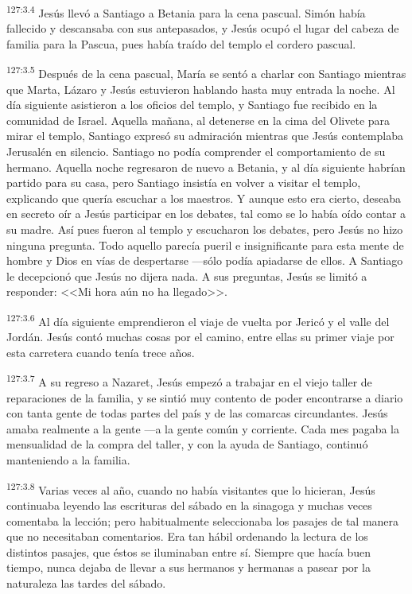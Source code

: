 \par 
\textsuperscript{127:3.4} Jesús llevó a Santiago a Betania para la cena pascual. Simón había fallecido y descansaba con sus antepasados, y Jesús ocupó el lugar del cabeza de familia para la Pascua, pues había traído del templo el cordero pascual.

\par 
\textsuperscript{127:3.5} Después de la cena pascual, María se sentó a charlar con Santiago mientras que Marta, Lázaro y Jesús estuvieron hablando hasta muy entrada la noche. Al día siguiente asistieron a los oficios del templo, y Santiago fue recibido en la comunidad de Israel. Aquella mañana, al detenerse en la cima del Olivete para mirar el templo, Santiago expresó su admiración mientras que Jesús contemplaba Jerusalén en silencio. Santiago no podía comprender el comportamiento de su hermano. Aquella noche regresaron de nuevo a Betania, y al día siguiente habrían partido para su casa, pero Santiago insistía en volver a visitar el templo, explicando que quería escuchar a los maestros. Y aunque esto era cierto, deseaba en secreto oír a Jesús participar en los debates, tal como se lo había oído contar a su madre. Así pues fueron al templo y escucharon los debates, pero Jesús no hizo ninguna pregunta. Todo aquello parecía pueril e insignificante para esta mente de hombre y Dios en vías de despertarse ---sólo podía apiadarse de ellos. A Santiago le decepcionó que Jesús no dijera nada. A sus preguntas, Jesús se limitó a responder: <<Mi hora aún no ha llegado>>.

\par 
\textsuperscript{127:3.6} Al día siguiente emprendieron el viaje de vuelta por Jericó y el valle del Jordán. Jesús contó muchas cosas por el camino, entre ellas su primer viaje por esta carretera cuando tenía trece años.

\par 
\textsuperscript{127:3.7} A su regreso a Nazaret, Jesús empezó a trabajar en el viejo taller de reparaciones de la familia, y se sintió muy contento de poder encontrarse a diario con tanta gente de todas partes del país y de las comarcas circundantes. Jesús amaba realmente a la gente ---a la gente común y corriente. Cada mes pagaba la mensualidad de la compra del taller, y con la ayuda de Santiago, continuó manteniendo a la familia.

\par 
\textsuperscript{127:3.8} Varias veces al año, cuando no había visitantes que lo hicieran, Jesús continuaba leyendo las escrituras del sábado en la sinagoga y muchas veces comentaba la lección; pero habitualmente seleccionaba los pasajes de tal manera que no necesitaban comentarios. Era tan hábil ordenando la lectura de los distintos pasajes, que éstos se iluminaban entre sí. Siempre que hacía buen tiempo, nunca dejaba de llevar a sus hermanos y hermanas a pasear por la naturaleza las tardes del sábado.

